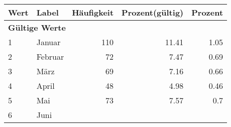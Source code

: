     \begin{longtable}{lXrrr}
     \toprule
     \textbf{Wert} & \textbf{Label} & \textbf{Häufigkeit} & \textbf{Prozent(gültig)} & \textbf{Prozent} \\
     \endhead
     \midrule
     \multicolumn{5}{l}{\textbf{Gültige Werte}}\\

     1 &
     \multicolumn{1}{X}{ Januar   } &


       \num{110} &
       \num[round-mode=places,round-precision=2]{11,41} &
         \num[round-mode=places,round-precision=2]{1,05} \\

     2 &
     \multicolumn{1}{X}{ Februar   } &


       \num{72} &
       \num[round-mode=places,round-precision=2]{7,47} &
         \num[round-mode=places,round-precision=2]{0,69} \\

     3 &
     \multicolumn{1}{X}{ März   } &


       \num{69} &
       \num[round-mode=places,round-precision=2]{7,16} &
         \num[round-mode=places,round-precision=2]{0,66} \\

     4 &
     \multicolumn{1}{X}{ April   } &


       \num{48} &
       \num[round-mode=places,round-precision=2]{4,98} &
         \num[round-mode=places,round-precision=2]{0,46} \\

     5 &
     \multicolumn{1}{X}{ Mai   } &


       \num{73} &
       \num[round-mode=places,round-precision=2]{7,57} &
         \num[round-mode=places,round-precision=2]{0,7} \\

     6 &
     \multicolumn{1}{X}{ Juni   } &



\end{longtable}
